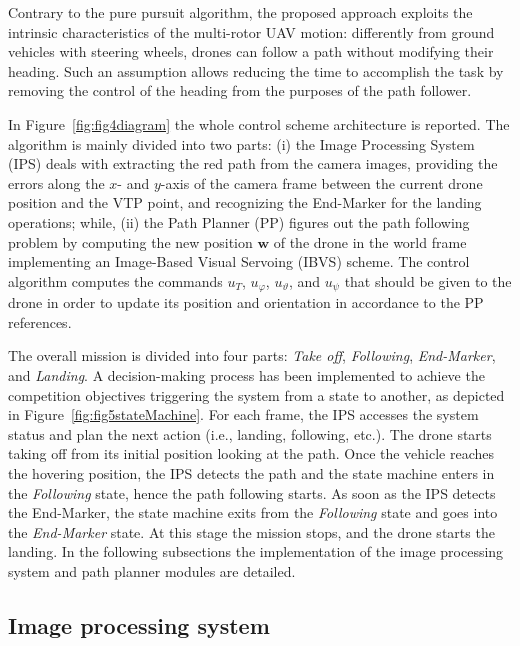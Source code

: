 \documentclass[a4paper,twocolumn,10pt]{article}
\begin{document}
    Contrary to the pure pursuit algorithm, the proposed approach exploits the intrinsic 
    characteristics of the multi-rotor UAV motion: differently from ground vehicles with steering 
    wheels, drones can follow a path without modifying their heading. Such an assumption allows 
    reducing the time to accomplish the task by removing the control of the heading from the purposes 
    of the path follower.

    In Figure~\ref{fig:fig4diagram} the whole control scheme architecture is reported. The algorithm is mainly divided into two parts: (i) the Image Processing System (IPS) deals with extracting the red path from the 
    camera images, providing the errors along the $x$- and $y$-axis of the camera frame between the current drone position and the VTP point, and recognizing the End-Marker for the landing operations; while, (ii) the Path Planner (PP) figures out the path following problem by computing the new 
    position $\mathbf{w}$ of the drone in the world frame\cite[Sec.~V]{SilanoMATFly} implementing 
    an Image-Based Visual Servoing (IBVS) scheme. The control algorithm computes the commands $u_T$, $u_\varphi$, $u_\vartheta$, and $u_\psi$ that should be given to the drone in order to update its position and orientation in accordance to the PP references. 

    The overall mission is divided into four parts: \textit{Take off}, \textit{Following}, \textit{End-Marker}, and \textit{Landing}. A decision-making process has been implemented to  achieve the competition objectives triggering the system from a state to another, as depicted in 
    Figure~\ref{fig:fig5stateMachine}. For each frame, the IPS accesses the system status and plan the next action (i.e., landing, following, etc.). The drone starts taking off from its initial position looking at the path. Once the vehicle reaches the hovering position, the IPS detects the path and the state machine enters in the \textit{Following} state, hence the path following starts. As soon as the IPS detects the End-Marker, the state machine exits from the \textit{Following} state and goes into the \textit{End-Marker} state. At this stage the mission stops, and the drone starts the landing. In the following subsections the implementation of the image processing system and path planner modules are detailed.

    \pagebreak
    \subsection{Image processing system}
\end{document}

